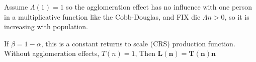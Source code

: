 Assume $\Lambda(1)=1$ so the agglomeration effect has no influence with one person in a multiplicative function like the Cobb-Douglas, and %
FIX die ${\Lambda}{n}>0$, so it is increasing with population.

If $\beta=1-\alpha$, this is a constant returns to scale (CRS) production function. Without agglomeration effects, $T(n)=1$,  Then  \textbf{$\mathbf{L(n) = T(n) n}$} 






